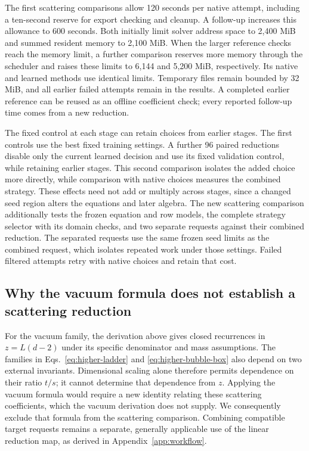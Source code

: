 The first scattering comparisons allow 120 seconds per native attempt, including a ten-second reserve for export checking and cleanup. A follow-up increases this allowance to 600 seconds. Both initially limit solver address space to 2,400 MiB and summed resident memory to 2,100 MiB. When the larger reference checks reach the memory limit, a further comparison reserves more memory through the scheduler and raises these limits to 6,144 and 5,200 MiB, respectively. Its native and learned methods use identical limits. Temporary files remain bounded by 32 MiB, and all earlier failed attempts remain in the results. A completed earlier reference can be reused as an offline coefficient check; every reported follow-up time comes from a new reduction.

The fixed control at each stage can retain choices from earlier stages. The first controls use the best fixed training settings. A further 96 paired reductions disable only the current learned decision and use its fixed validation control, while retaining earlier stages. This second comparison isolates the added choice more directly, while comparison with native choices measures the combined strategy. These effects need not add or multiply across stages, since a changed seed region alters the equations and later algebra. The new scattering comparison additionally tests the frozen equation and row models, the complete strategy selector with its domain checks, and two separate requests against their combined reduction. The separated requests use the same frozen seed limits as the combined request, which isolates repeated work under those settings. Failed filtered attempts retry with native choices and retain that cost.

\subsection{Why the vacuum formula does not establish a scattering reduction}
For the vacuum family, the derivation above gives closed recurrences in $z=L(d-2)$ under its specific denominator and mass assumptions. The families in Eqs.~\eqref{eq:higher-ladder} and \eqref{eq:higher-bubble-box} also depend on two external invariants. Dimensional scaling alone therefore permits dependence on their ratio $t/s$; it cannot determine that dependence from $z$. Applying the vacuum formula would require a new identity relating these scattering coefficients, which the vacuum derivation does not supply. We consequently exclude that formula from the scattering comparison. Combining compatible target requests remains a separate, generally applicable use of the linear reduction map, as derived in Appendix~\ref{app:workflow}.
